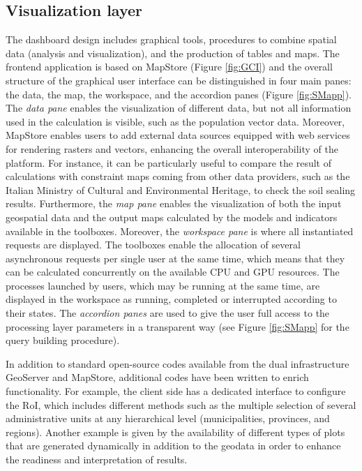 \documentclass[APA,LATO1COL,doublespace]{WileyNJD-v2}
\begin{document}
\subsection{Visualization layer}
The dashboard design includes graphical tools, procedures to combine spatial data (analysis and visualization), and the production of tables and maps. 
The frontend application is based on MapStore (Figure \ref{fig:GCI}) and the overall structure of the graphical user interface can be distinguished in four main panes: the data, the map, the workspace, and the accordion panes (Figure \ref{fig:SMapp}).
The \textit{data pane} enables the visualization of different data, but not all information used in the calculation is visible, such as the population vector data. 
Moreover, MapStore enables users to add external data sources equipped with web services for rendering rasters and vectors, enhancing the overall interoperability of the platform. 
For instance, it can be particularly useful to compare the result of calculations with constraint maps coming from other data providers, such as the Italian Ministry of Cultural and Environmental Heritage, to check the soil sealing results. Furthermore, the \textit{map pane} enables the visualization of both the input geospatial data and the output maps calculated by the models and indicators available in the toolboxes. 
Moreover, the \textit{workspace pane} is where all instantiated requests are displayed. 
The toolboxes enable the allocation of several asynchronous requests per single user at the same time, which means that they can be calculated concurrently on the available CPU and GPU resources. 
The processes launched by users, which may be running at the same time, are displayed in the workspace as running, completed or interrupted according to their states. 
The \textit{accordion panes} are used to give the user full access to the processing layer parameters in a transparent way (see Figure \ref{fig:SMapp} for the query building procedure).

In addition to standard open-source codes available from the dual infrastructure GeoServer and MapStore, additional codes have been written to enrich functionality. 
For example, the client side has a dedicated interface to configure the RoI, which includes different methods such as the multiple selection of several administrative units at any hierarchical level (municipalities, provinces, and regions). 
Another example is given by the availability of different types of plots that are generated dynamically in addition to the geodata in order to enhance the readiness and interpretation of results.
\end{document}
